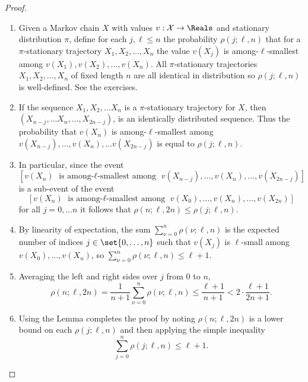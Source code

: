 \documentclass[12pt]{article}
\begin{document}
\begin{proof}
    \begin{enumerate}
        \item
            Given a Markov chain \( X \) with values \( v:  \mathcal{X}
            \to \Reals \) and stationary distribution \( \pi \), define
            for each \( j, \ell \le n \) the probability \( \rho(j; \ell,
            n) \) that for a \( \pi \)-stationary trajectory \( X_1, X_2,
            \dots, X_n \) the value \( v(X_j) \) is among-\( \ell \)-smallest
            among \( v(X_1), v(X_2), \dots, v(X_n) \).  All \( \pi \)-stationary
            trajectories \( X_1, X_2, \dots, X_n \) of fixed length \( n
            \) are all identical in distribution so \( \rho(j; \ell, n) \)
            is well-defined.  See the exercises.
        \item
            If the sequence \( X_1, X_2, \dots X_n \) is a \( \pi \)-stationary
            trajectory for \( X \), then \( (X_{n-j}, \dots X_n, \dots,
            X_{2n-j}) \), is an identically distributed sequence.  Thus
            the probability that \( v(X_n) \) is among-\( \ell \)-smallest
            among \( v(X_{n-j}), \dots, v(X_n), \dots v(X_{2n-j}) \) is
            equal to \( \rho(j; \ell, n) \).
        \item
            In particular, since the event
            \[
                [v(X_n) \text{ is among-$\ell$-smallest among } v(X_
                {n-j}), \dots, v(X_n), \dots, v(X_{2n-j})]
            \] is a sub-event of the event
            \[
                [v(X_n) \text{ is among-$\ell$-smallest among } v(X_0),
                \dots, v(X_n), \dots, v(X_{2n})]
            \] for all \( j = 0, \dots n \) it follows that \( \rho(n;
            \ell, 2n) \le \rho(j; \ell, n) \).
        \item
            By linearity of expectation, the sum \( \sum_{\nu=0}^n \rho(
            \nu; \ell, n) \) is the expected number of indices \( j \in
            \set{0, \dots, n} \) such that \( v(X_j) \) is \( \ell \)-small
            among \( v(X_0), \dots, v(X_n) \), so \( \sum_{\nu=0}^n \rho
            (\nu; \ell, n) \le \ell + 1 \).
        \item
            Averaging the left and right sides over \( j \) from \( 0 \)
            to \( n \),
            \[
                \rho(n; \ell, 2n) = \frac{1}{n+1} \sum_{\nu=0}^n \rho(\nu;
                \ell, n) \le \frac{\ell + 1}{n+1} < 2 \cdot \frac{\ell+1}
                {2n+1}.
            \]
        \item
            Using the Lemma completes the proof by noting \( \rho(n;
            \ell, 2n) \) is a lower bound on each \( \rho(j; \ell, n) \)
            and then applying the simple inequality
            \begin{equation}
                \label{eq:parallelsignificance:eight} \sum\limits_{j=0}^n
                \rho(j; \ell, n) \le \ell + 1.
            \end{equation}
    \end{enumerate}
\end{proof}
\end{document}
